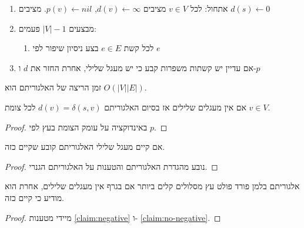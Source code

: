 \begin{enumerate}
\item
אתחול: לכל
$v \in V$
מציבים 
$d(v) \leftarrow \infty$, 
$p(v) \leftarrow nil$.
מציבים
$d(s) \leftarrow 0$
\item
מבצעים 
$|V| - 1$
פעמים:
\begin{enumerate}
\item
לכל קשת 
$e \in E$
בצע ניסיון שיפור לפי $e$
\end{enumerate}
\item
אם עדיין יש קשתות משפרות קבע כי יש מעגל שלילי, אחרת החזר את $d$ ו-$p$
\end{enumerate}

זמן הריצה של האלגוריתם הוא 
$O(|V||E|)$.

\begin{claim}
\label{claim:no-negative}
אם אין מעגלים שלילים אז בסיום האלגוריתם
$d(v) = \delta(s,v)$
לכל צומת 
$v \in V$.
\end{claim}

\begin{proof}
באינדוקציה על עומק הצומת בעץ לפי $p$.
\end{proof}

\begin{claim}
\label{claim:negative}
אם קיים מעגל שלילי האלגוריתם קובע שקיים כזה.
\end{claim}

\begin{proof}
נובע מהגדרת האלגוריתם והטענות על האלגוריתם הגנרי.
\end{proof}

\begin{theorem}
אלגוריתם בלמן פורד פולט עץ מסלולים קלים ביותר אם בגרף אין מעגלים שלילים, 
אחרת הוא מודיע כי קיים כזה.
\end{theorem}

\begin{proof}
מיידי מטענות 
\ref{claim:negative}
ו-%
\ref{claim:no-negative}.
\end{proof}

